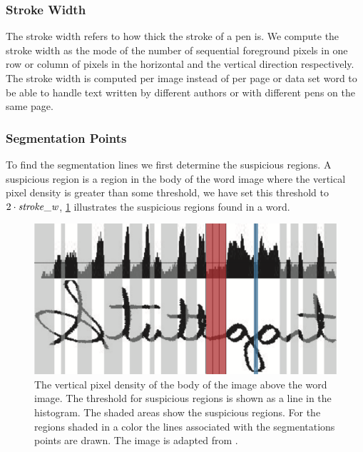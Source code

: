 \subsubsection{Stroke Width}
\label{sss:method:segmentaton:strokwidth}
	The stroke width refers to how thick the stroke of a pen is. We compute the stroke width as the mode of the number of sequential foreground pixels in one row or column of pixels in the horizontal and the vertical direction respectively. The stroke width is computed per image instead of per page or data set word to be able to handle text written by different authors or with different pens on the same page.

\subsubsection{Segmentation Points}
\label{sss:method:segmentaton:segmentationpoints}
	To find the segmentation lines we first determine the suspicious regions. A suspicious region is a region in the body of the word image where the vertical pixel density is greater than some threshold, we have set this threshold to $2 \cdot \mathit{stroke\_w}$, \cref{fig:method:segmentation:suspiciousRegions} illustrates the suspicious regions found in a word. 

	\begin{figure}
		\centering
		\includegraphics[width=\columnwidth]{shared/img/method/suspicious_regions.png}
		\caption{The vertical pixel density of the body of the image above the word image.  The threshold for suspicious regions is shown as a line in the histogram. The shaded areas show the suspicious regions. For the regions shaded in a color the lines associated with the segmentations points are drawn. The image is adapted from \cite{lee2012binary}.}
		\label{fig:method:segmentation:suspiciousRegions}
	\end{figure}

